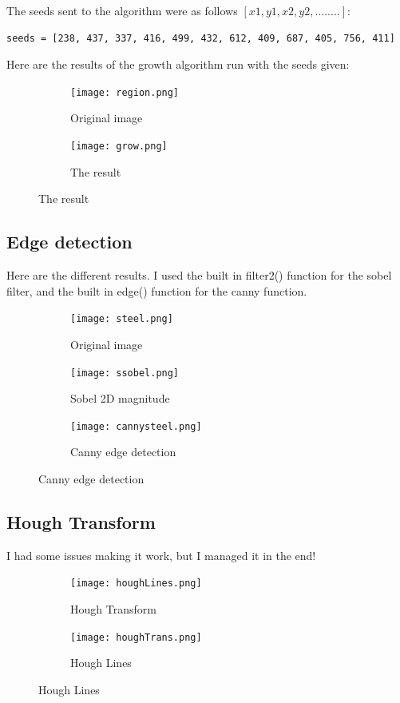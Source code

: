 \documentclass{article}
\begin{document}
\newpage
The seeds sent to the algorithm were as follows $[x1, y1, x2, y2,........]$: 
\begin{verbatim}
seeds = [238, 437, 337, 416, 499, 432, 612, 409, 687, 405, 756, 411]
\end{verbatim}
Here are the results of the growth algorithm run with the seeds given:
\begin{figure}[h]
	\begin{subfigure}[h]{0.45\textwidth}
		\texttt{[image: region.png]}
		\caption{Original image}
		\label{fig:region.png}
	\end{subfigure}
	\begin{subfigure}[h]{0.45\textwidth}
		\texttt{[image: grow.png]}
		\caption{The result}
		\label{fig:grow.png}
	\end{subfigure}
\end{figure}

\newpage
\subsection{Edge detection}
Here are the different results. I used the built in filter2() function for the sobel filter, and the built in edge() function for the canny function.
\begin{figure}[h]
	\begin{subfigure}[h]{0.45\textwidth}
		\texttt{[image: steel.png]}
		\caption{Original image}
		\label{fig:steel.png}
	\end{subfigure}
	\begin{subfigure}[h]{0.45\textwidth}
		\texttt{[image: ssobel.png]}
		\caption{Sobel 2D magnitude}
		\label{fig:ssobel.png}
	\end{subfigure}
	\begin{subfigure}[h]{0.45\textwidth}
		\texttt{[image: cannysteel.png]}
		\caption{Canny edge detection}
		\label{fig:cannysteel.png}
	\end{subfigure}
\end{figure}

\newpage
\subsection{Hough Transform}
I had some issues making it work, but I managed it in the end!
\begin{figure}[h]
	\begin{subfigure}[h]{0.45\textwidth}
		\texttt{[image: houghLines.png]}
		\caption{Hough Transform}
		\label{fig:houghLines.png}
	\end{subfigure}
	\begin{subfigure}[h]{0.45\textwidth}
		\texttt{[image: houghTrans.png]}
		\caption{Hough Lines}
		\label{fig:houghTrans.png}
	\end{subfigure}
\end{figure}
\end{document}

